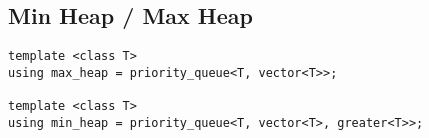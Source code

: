 \subsection{Min Heap / Max Heap}
\begin{lstlisting}
template <class T>
using max_heap = priority_queue<T, vector<T>>;

template <class T>
using min_heap = priority_queue<T, vector<T>, greater<T>>;
\end{lstlisting}